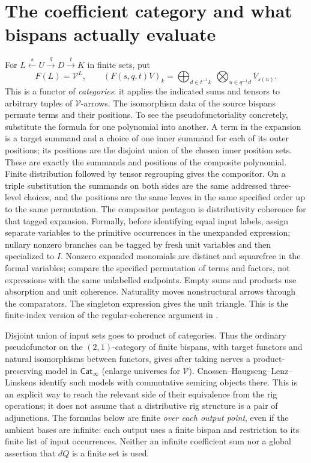 \documentclass[11pt]{article}
\theoremstyle{definition}
\newcommand{\Cat}{\mathsf{Cat}}
\newcommand{\V}{\mathcal V}
\begin{document}
\section{The coefficient category and what bispans actually evaluate}

For $L\xleftarrow{s}U\xrightarrow{q}D\xrightarrow{t}K$ in finite sets, put
\begin{equation}
 F(L)=\V^L,\qquad
 (F(s,q,t)V)_k=
 \bigoplus_{d\in t^{-1}k}\ \bigotimes_{u\in q^{-1}d} V_{s(u)} .
 \label{eq:raw}
\end{equation}
This is a functor of \emph{categories}: it applies the indicated sums
and tensors to arbitrary tuples of $\V$-arrows. The isomorphism data of
the source bispans permute terms and their positions. To see the
pseudofunctoriality concretely, substitute the formula for one polynomial
into another. A term in the expansion is a target summand and a choice of
one inner summand for each of its outer positions; its positions are the
disjoint union of the chosen inner position sets. These are exactly the
summands and positions of the composite polynomial. Finite distribution
followed by tensor regrouping gives the compositor. On a triple
substitution the summands on both sides are the same addressed
three-level choices, and the positions are the same leaves in the
same specified order up to the same permutation. The compositor pentagon
is distributivity coherence for that tagged expansion. Formally, before
identifying equal input labels, assign separate variables to the primitive
occurrences in the unexpanded expression; nullary nonzero branches can be
tagged by fresh unit variables and then specialized to $I$. Nonzero
expanded monomials are distinct and squarefree in the formal variables;
compare the specified permutation of terms and factors, not expressions
with the same unlabelled endpoints. Empty sums and products use absorption
and unit coherence. Naturality moves nonstructural arrows through the
comparators. The singleton expression gives the unit triangle. This is
the finite-index version of the regular-coherence argument in
\cite[Sec.~3, structural coherence]{O1}.

Disjoint union of input sets goes to product of categories. Thus the
ordinary pseudofunctor on the $(2,1)$-category of finite bispans, with
target functors and natural isomorphisms between functors, gives after
taking nerves a product-preserving model in $\Cat_\infty$ (enlarge
universes for $\V$). Cnossen--Haugseng--Lenz--Linskens
\cite[Theorem A, Secs.~2.2, 3.3, 4.3]{CHLL} identify such models with
commutative semiring objects there. This is an explicit way to reach the
relevant side of their equivalence from the rig operations; it does not
assume that a distributive rig structure is a pair of adjunctions.
The formulas below are finite \emph{over each output point}, even if the
ambient bases are infinite: each output uses a finite bispan and
restriction to its finite list of input occurrences. Neither an infinite
coefficient sum nor a global assertion that $dQ$ is a finite set is used.
\end{document}
